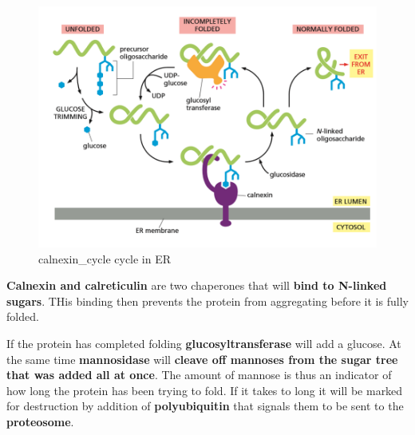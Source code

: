 \documentclass[../main.tex]{subfiles}
\begin{document}
\begin{figure}[H]
    \centering
    \includegraphics[width=\linewidth]{calCycle.png}
    \caption{\gls{calnexin_cycle} cycle in ER}
    \label{fig:enter-label}
\end{figure}
\textbf{Calnexin and calreticulin} are two chaperones that will \textbf{bind to N-linked sugars}. THis binding then prevents the protein from aggregating before it is fully folded.
\par
 If the protein has completed folding \textbf{\gls{glucosyltransferase}} will add a glucose. At the same time \textbf{\gls{mannosidase}} will \textbf{cleave off mannoses from the sugar tree that was added all at once}. The amount of mannose is thus an indicator of how long the protein has been trying to fold. If it takes to long it will be marked for destruction by addition of \textbf{polyubiquitin }that signals them to be sent to the \textbf{proteosome}.
\end{document}
